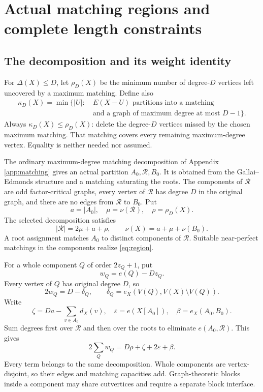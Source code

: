 \documentclass[11pt,a4paper]{article}
\theoremstyle{definition}
\begin{document}
\section{Actual matching regions and complete length constraints}\label{sec:regions}
\subsection{The decomposition and its weight identity}
For $\Delta(X)\le D$, let $\rho_D(X)$ be the minimum number of degree-$D$ vertices left uncovered by a maximum matching. Define also
\[
\begin{aligned}
\kappa_D(X)=\min\{|U|:\ &E(X-U)\text{ partitions into a matching}\\
&\text{and a graph of maximum degree at most }D-1\}.
\end{aligned}
\]
Always $\kappa_D(X)\le\rho_D(X)$: delete the degree-$D$ vertices missed by the chosen maximum matching. That matching covers every remaining maximum-degree vertex. Equality is neither needed nor assumed.

The ordinary maximum-degree matching decomposition of Appendix \ref{app:matching} gives an actual partition $A_0,\mathcal R,B_0$. It is obtained from the Gallai--Edmonds structure and a matching saturating the roots. The components of $\mathcal R$ are odd factor-critical graphs, every vertex of $\mathcal R$ has degree $D$ in the original graph, and there are no edges from $\mathcal R$ to $B_0$. Put
\[
a=|A_0|,\quad \mu=\nu(\mathcal R),\quad \rho=\rho_D(X).
\]
The selected decomposition satisfies
\begin{equation}\label{eq:region}
|\mathcal R|=2\mu+a+\rho,\qquad
\nu(X)=a+\mu+\nu(B_0).
\end{equation}
A root assignment matches $A_0$ to distinct components of $\mathcal R$. Suitable near-perfect matchings in the components realize \eqref{eq:region}.

For a whole component $Q$ of order $2z_Q+1$, put
\[
w_Q=e(Q)-Dz_Q.
\]
Every vertex of $Q$ has original degree $D$, so
\begin{equation}\label{eq:coreweight}
2w_Q=D-\delta_Q,\qquad
\delta_Q=e_X(V(Q),V(X)\setminus V(Q)).
\end{equation}
Write
\[
\zeta=Da-\sum_{v\in A_0}d_X(v),\quad
\varepsilon=e(X[A_0]),\quad \beta=e_X(A_0,B_0).
\]
Sum degrees first over $\mathcal R$ and then over the roots to eliminate $e(A_0,\mathcal R)$. This gives
\begin{equation}\label{eq:handshake}
2\sum_Qw_Q=D\rho+\zeta+2\varepsilon+\beta.
\end{equation}
Every term belongs to the same decomposition. Whole components are vertex-disjoint, so their edges and matching capacities add. Graph-theoretic blocks inside a component may share cutvertices and require a separate block interface.
\end{document}

